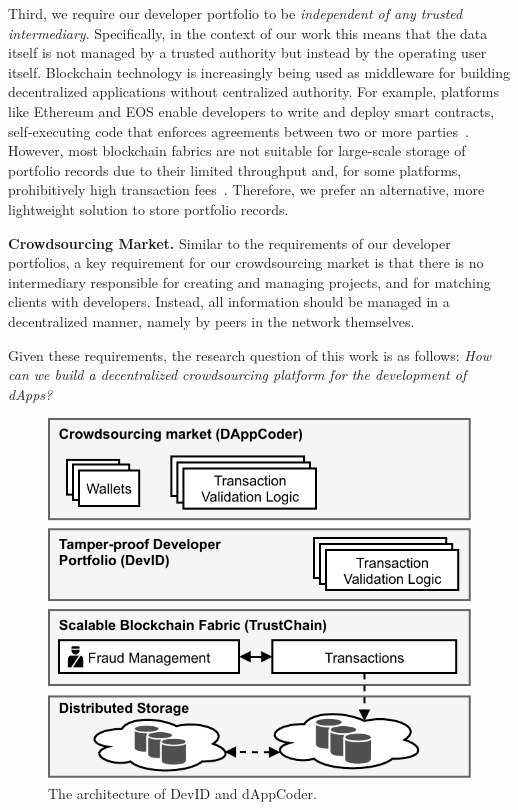 Third, we require our developer portfolio to be \emph{independent of any trusted intermediary}.
Specifically, in the context of our work this means that the data itself is not managed by a trusted authority but instead by the operating user itself.
Blockchain technology is increasingly being used as middleware for building decentralized applications without centralized authority.
For example, platforms like Ethereum and EOS enable developers to write and deploy smart contracts, self-executing code that enforces agreements between two or more parties~\cite{szabo1997formalizing}.
However, most blockchain fabrics are not suitable for large-scale storage of portfolio records due to their limited throughput and, for some platforms, prohibitively high transaction fees~\cite{eberhardt2017or}.
Therefore, we prefer an alternative, more lightweight solution to store portfolio records.

\textbf{Crowdsourcing Market.}
Similar to the requirements of our developer portfolios, a key requirement for our crowdsourcing market is that there is no intermediary responsible for creating and managing projects, and for matching clients with developers.
Instead, all information should be managed in a decentralized manner, namely by peers in the network themselves.

Given these requirements, the research question of this work is as follows:
\textit{How can we build a decentralized crowdsourcing platform for the development of dApps?}
\begin{figure}[t!]
	\centering
	\includegraphics[width=.7\linewidth]{devid/resources/architecture.pdf}
	\caption{The architecture of DevID and dAppCoder.}
	\label{fig:dappcoder_system_architecture}
\end{figure}


